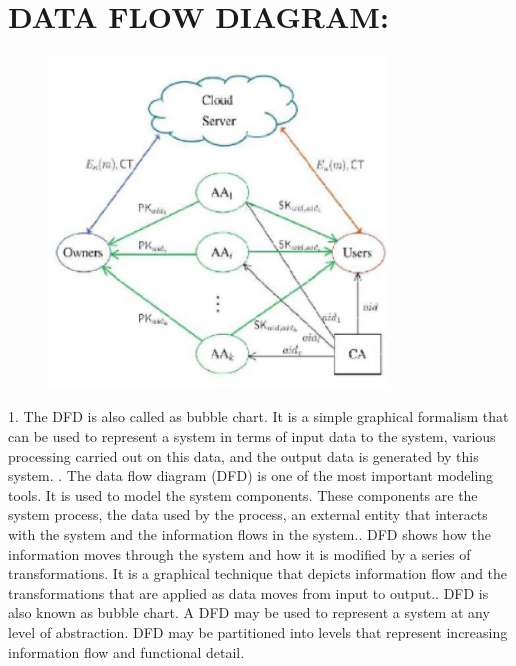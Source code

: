 \documentclass[11pt,a4paper]{report}
\begin{document}
\section{DATA FLOW DIAGRAM:}


\begin{figure}
\centering
\includegraphics[width=0.8\textwidth]{ew.png}
\caption{\label{fig:SYSTEM ARCHITECTURE}}
\end{figure}


1. The DFD is also called as bubble chart. It is
a simple graphical formalism that can be
used to represent a system in terms of input
data to the system, various processing carried
out on this data, and the output data is
generated by this system. \newline {}. The data flow diagram (DFD) is one of the
most important modeling tools. It is used to
model the system components. These
components are the system process, the data
used by the process, an external entity that
interacts with the system and the information
flows in the system.\newline {}. DFD shows how the information moves
through the system and how it is modified by
a series of transformations. It is a graphical
technique that depicts information flow and
the transformations that are applied as data
moves from input to output.\newline {}. DFD is also known as bubble chart. A DFD
may be used to represent a system at any
level of abstraction. DFD may be partitioned
into levels that represent increasing
information flow and functional detail.
\end{document}
